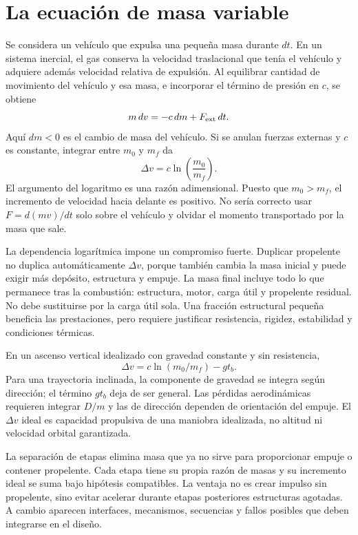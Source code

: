 \section{La ecuación de masa variable}
Se considera un vehículo que expulsa una pequeña masa durante $dt$. En un sistema inercial, el gas conserva la velocidad traslacional que tenía el vehículo y adquiere además velocidad relativa de expulsión. Al equilibrar cantidad de movimiento del vehículo y esa masa, e incorporar el término de presión en $c$, se obtiene
\begin{equation}
 m\,dv=-c\,dm+F_{\rm ext}\,dt.
\end{equation}
Aquí $dm<0$ es el cambio de masa del vehículo. Si se anulan fuerzas externas y $c$ es constante, integrar entre $m_0$ y $m_f$ da
\begin{equation}
 \Delta v=c\ln\left(\frac{m_0}{m_f}\right).
\end{equation}
El argumento del logaritmo es una razón adimensional. Puesto que $m_0>m_f$, el incremento de velocidad hacia delante es positivo. No sería correcto usar $F= d(mv)/dt$ solo sobre el vehículo y olvidar el momento transportado por la masa que sale.

La dependencia logarítmica impone un compromiso fuerte. Duplicar propelente no duplica automáticamente $\Delta v$, porque también cambia la masa inicial y puede exigir más depósito, estructura y empuje. La masa final incluye todo lo que permanece tras la combustión: estructura, motor, carga útil y propelente residual. No debe sustituirse por la carga útil sola. Una fracción estructural pequeña beneficia las prestaciones, pero requiere justificar resistencia, rigidez, estabilidad y condiciones térmicas.

En un ascenso vertical idealizado con gravedad constante y sin resistencia,
\begin{equation}
 \Delta v=c\ln(m_0/m_f)-g t_b.
\end{equation} Para una trayectoria inclinada, la componente de gravedad se integra según dirección; el término $gt_b$ deja de ser general. Las pérdidas aerodinámicas requieren integrar $D/m$ y las de dirección dependen de orientación del empuje. El $\Delta v$ ideal es capacidad propulsiva de una maniobra idealizada, no altitud ni velocidad orbital garantizada.

La separación de etapas elimina masa que ya no sirve para proporcionar empuje o contener propelente. Cada etapa tiene su propia razón de masas y su incremento ideal se suma bajo hipótesis compatibles. La ventaja no es crear impulso sin propelente, sino evitar acelerar durante etapas posteriores estructuras agotadas. A cambio aparecen interfaces, mecanismos, secuencias y fallos posibles que deben integrarse en el diseño.

